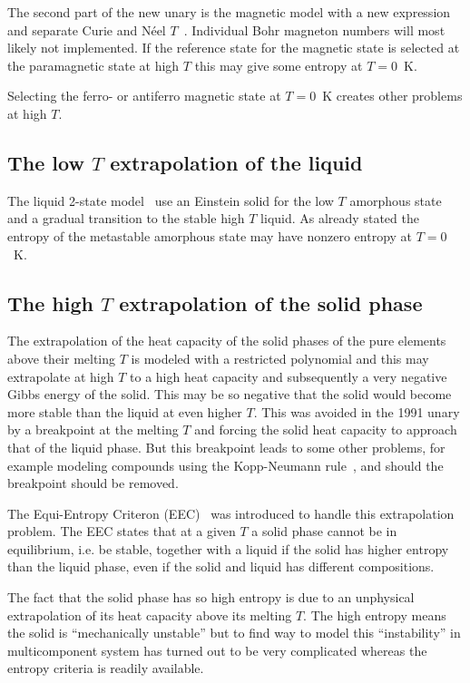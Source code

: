 \documentclass[12pt]{article}
\begin{document}
\begin{appendices}
The second part of the new unary is the magnetic model with a new
expression and separate Curie and N{\'e}el $T$~\cite{12Xiong}.
Individual Bohr magneton numbers will most likely not implemented.  If
the reference state for the magnetic state is selected at the
paramagnetic state at high $T$ this may give some entropy at $T=0$~K.

Selecting the ferro- or antiferro magnetic state at $T=0$~K creates
other problems at high $T$.

\subsection{The low $T$ extrapolation of the liquid}

The liquid 2-state model~\cite{14Becker} use an Einstein solid for the
low $T$ amorphous state and a gradual transition to the stable high
$T$ liquid.  As already stated the entropy of the metastable amorphous
state may have nonzero entropy at $T=0$~K.

\subsection{The high $T$ extrapolation of the solid phase}

The extrapolation of the heat capacity of the solid phases of the pure
elements above their melting $T$ is modeled with a restricted
polynomial and this may extrapolate at high $T$ to a high heat
capacity and subsequently a very negative Gibbs energy of the solid.
This may be so negative that the solid would become more stable than
the liquid at even higher $T$.  This was avoided in the 1991 unary by
a breakpoint at the melting $T$ and forcing the solid heat capacity to
approach that of the liquid phase.  But this breakpoint leads to some
other problems, for example modeling compounds using the Kopp-Neumann
rule~\cite{Kopp-Neumann}, and should the breakpoint should be removed.

The Equi-Entropy Criteron (EEC)~\cite{20Sun} was introduced to handle
this extrapolation problem.  The EEC states that at a given $T$ a
solid phase cannot be in equilibrium, i.e. be stable, together with a
liquid if the solid has higher entropy than the liquid phase, even if
the solid and liquid has different compositions.

The fact that the solid phase has so high entropy is due to an
unphysical extrapolation of its heat capacity above its melting $T$.
The high entropy means the solid is ``mechanically unstable'' but to
find way to model this ``instability'' in multicomponent system has
turned out to be very complicated whereas the entropy criteria is
readily available.


\end{appendices}
\end{document}
